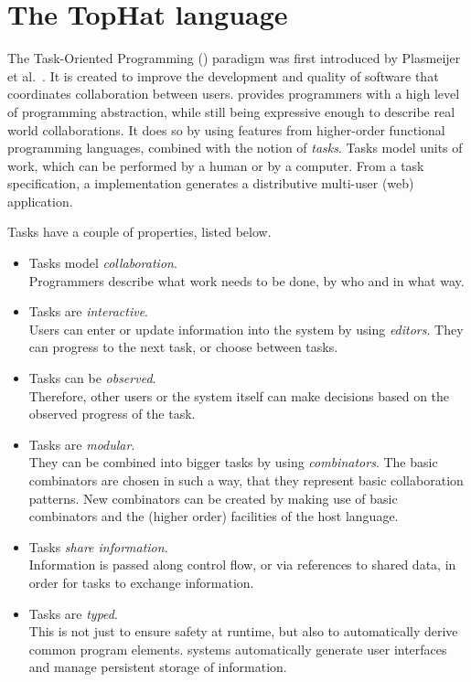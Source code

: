 
\section{The TopHat language}
\label{sec:tophat}

The Task-Oriented Programming (\TOP) paradigm was first introduced by Plasmeijer et al.~\cite{DBLP:conf/ppdp/PlasmeijerLMAK12}.
It is created to improve the development and quality of software that coordinates collaboration between users.
\TOP provides programmers with a high level of programming abstraction,
while still being expressive enough to describe real world collaborations.
It does so by using features from higher-order functional programming languages,
combined with the notion of \emph{tasks}.
Tasks model units of work, which can be performed by a human or by a computer.
From a task specification, a \TOP implementation generates a distributive multi-user (web) application.

Tasks have a couple of properties, listed below.
\begin{itemize}
  \item
    Tasks model \emph{collaboration}.\\
    Programmers describe what work needs to be done, by who and in what way.
  \item
    Tasks are \emph{interactive}.\\
    Users can enter or update information into the system by using \emph{editors}. They can progress to the next task, or choose between tasks.
  \item
    Tasks can be \emph{observed}.\\
    Therefore, other users or the system itself can make decisions based on the observed progress of the task.
  \item
    Tasks are \emph{modular}.\\
    They can be combined into bigger tasks by using \emph{combinators}.
    The basic combinators are chosen in such a way, that they represent basic collaboration patterns.
    New combinators can be created by making use of basic combinators and the (higher order) facilities of the host language.
  \item
    Tasks \emph{share information}.\\
    Information is passed along control flow, or via references to shared data, in order for tasks to exchange information.
  \item
    Tasks are \emph{typed}.\\
    This is not just to ensure safety at runtime,
    but also to automatically derive common program elements.
    \TOP systems automatically generate user interfaces and manage persistent storage of information.
\end{itemize}

